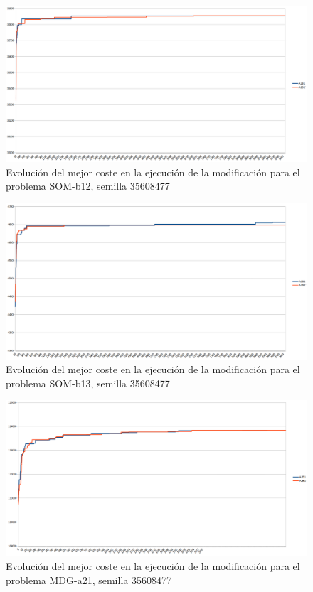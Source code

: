 	\begin{figure}[H]
		\centering
		\includegraphics[scale=0.3]{img/convergenciaSOM2mejora.png}
		\caption{Evolución del mejor coste en la ejecución de la modificación para el problema SOM-b12, semilla 35608477}
		\label{SOM-b_12_convergencia_mejora}
	\end{figure}

	\begin{figure}[H]
		\centering
		\includegraphics[scale=0.3]{img/convergenciaSOM3mejora.png}
		\caption{Evolución del mejor coste en la ejecución de la modificación para el problema SOM-b13, semilla 35608477}
		\label{SOM-b_13_convergencia_mejora}
	\end{figure}

	\begin{figure}[H]
		\centering
		\includegraphics[scale=0.3]{img/convergenciaMDG1mejora.png}
		\caption{Evolución del mejor coste en la ejecución de la modificación para el problema MDG-a21, semilla 35608477}
		\label{MDG-a_21_convergencia_mejora}
	\end{figure}

